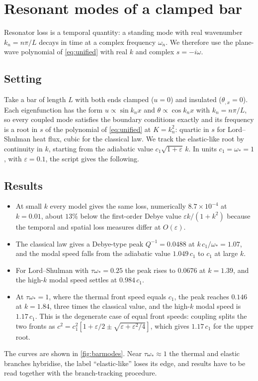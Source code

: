 \section{Resonant modes of a clamped bar}\label{sec:bar}

Resonator loss is a temporal quantity: a standing mode with real wavenumber $k_n=n\pi/L$ decays in time at a complex frequency $\omega_n$. We therefore use the plane-wave polynomial of \cref{eq:unified} with real $k$ and complex $s=-i\omega$.

\subsection{Setting}
Take a bar of length $L$ with both ends clamped ($u=0$) and insulated ($\theta_{,x}=0$). Each eigenfunction has the form $u\propto\sin k_nx$ and $\theta\propto\cos k_nx$ with $k_n=n\pi/L$, so every coupled mode satisfies the boundary conditions exactly and its frequency is a root in $s$ of the polynomial of \cref{eq:unified} at $K=k_n^2$: quartic in $s$ for Lord--Shulman heat flux, cubic for the classical law. We track the elastic-like root by continuity in $k$, starting from the adiabatic value $c_1\sqrt{1+\varepsilon}\,k$. In units $c_1=\omega_*=1$, with $\varepsilon=0.1$, the script  gives the following.

\subsection{Results}
\begin{itemize}
\item At small $k$ every model gives the same loss, numerically $8.7\times10^{-4}$ at $k=0.01$, about $13\%$ below the first-order Debye value $\varepsilon k/(1+k^2)$ because the temporal and spatial loss measures differ at $O(\varepsilon)$.
\item The classical law gives a Debye-type peak $Q^{-1}=0.0488$ at $k\,c_1/\omega_*=1.07$, and the modal speed falls from the adiabatic value $1.049\,c_1$ to $c_1$ at large $k$.
\item For Lord--Shulman with $\tau\omega_*=0.25$ the peak rises to $0.0676$ at $k=1.39$, and the high-$k$ modal speed settles at $0.984\,c_1$.
\item At $\tau\omega_*=1$, where the thermal front speed equals $c_1$, the peak reaches $0.146$ at $k=1.84$, three times the classical value, and the high-$k$ modal speed is $1.17\,c_1$. This is the degenerate case of equal front speeds: coupling splits the two fronts as $c^2=c_1^2[1+\varepsilon/2\pm\sqrt{\varepsilon+\varepsilon^2/4}]$, which gives $1.17\,c_1$ for the upper root.
\end{itemize}
The curves are shown in \cref{fig:barmodes}. Near $\tau\omega_*\approx1$ the thermal and elastic branches hybridise, the label ``elastic-like'' loses its edge, and results have to be read together with the branch-tracking procedure.


